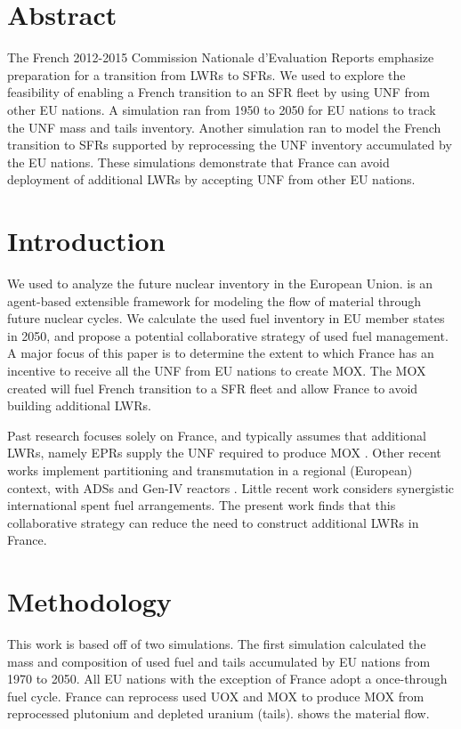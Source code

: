 \section{Abstract}
The French 2012-2015 Commission Nationale d'Evaluation Reports
\cite{cne2_reports_2015} emphasize preparation for a transition from \glspl{LWR} to \glspl{SFR}.
We used \Cyclus \cite{huff_fundamental_2016} to explore the feasibility of enabling a French
transition to an \gls{SFR} fleet by using \gls{UNF} from other \gls{EU} nations.
A \Cyclus simulation ran from 1950 to 2050 for \gls{EU} nations to track the \gls{UNF} mass
and tails inventory. Another simulation ran to model the French
transition to \glspl{SFR} supported by reprocessing the \gls{UNF} inventory accumulated by the \gls{EU} nations.
These simulations demonstrate that France can avoid deployment
of additional \glspl{LWR} by accepting \gls{UNF} from other EU nations.


\section{Introduction}
We used \Cyclus to analyze
the future nuclear inventory in the European Union. \Cyclus is an agent-based extensible
framework for modeling the flow of material through future nuclear cycles.
We calculate the used fuel
inventory in \gls{EU} member states in 2050, and propose a potential collaborative strategy of used fuel
management.
A major focus of this paper is to determine the extent to which France has an incentive
to receive all the \gls{UNF} from \gls{EU} nations to create \gls{MOX}.
The \gls{MOX} created will fuel French transition to a \gls{SFR} fleet
and allow France to avoid building additional \glspl{LWR}.

Past research focuses solely on France, and typically assumes that additional \glspl{LWR},
namely \glspl{EPR} supply the \gls{UNF} required to produce \gls{MOX} \cite{carre_overview_2009, martin_symbiotic_2017, freynet_multiobjective_2016}.
Other recent works implement partitioning and transmutation
in a regional (European) context, with \glspl{ADS} and Gen-IV reactors \cite{fazio_study_2013}.
Little recent work considers synergistic international spent fuel arrangements.
The present work finds that this collaborative strategy can reduce the
need to construct additional \glspl{LWR} in France.

\section{Methodology}
This work is based off of  two \Cyclus simulations. 
The first simulation calculated
the mass and composition of used fuel and tails accumulated by \gls{EU} nations from 1970 to 2050.
All EU nations with the exception of France adopt a once-through fuel cycle.
France can reprocess used \gls{UOX} and \gls{MOX} to
produce \gls{MOX} from reprocessed plutonium and depleted uranium (tails).
 shows the material flow.

